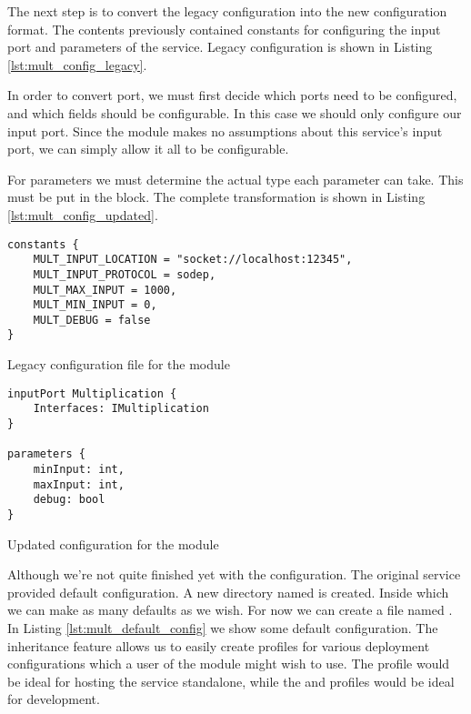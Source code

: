 The next step is to convert the legacy configuration into the new configuration
format. The contents  previously contained constants for
configuring the input port and parameters of the service. Legacy configuration
is shown in Listing \ref{lst:mult_config_legacy}.

In order to convert port, we must first decide which ports need to be
configured, and which fields should be configurable. In this case we should
only configure our input port. Since the module makes no assumptions about this
service's input port, we can simply allow it all to be configurable.

For parameters we must determine the actual type each parameter can take. This
must be put in the  block. The complete transformation is
shown in Listing \ref{lst:mult_config_updated}.

\begin{listing}[H]

\begin{verbatim}
constants {
    MULT_INPUT_LOCATION = "socket://localhost:12345",
    MULT_INPUT_PROTOCOL = sodep,
    MULT_MAX_INPUT = 1000,
    MULT_MIN_INPUT = 0,
    MULT_DEBUG = false
}
\end{verbatim}

\caption{Legacy configuration file for the  module}

\label{lst:mult_config_legacy}

\end{listing}

\begin{listing}[H]
\begin{verbatim}
inputPort Multiplication {
    Interfaces: IMultiplication
}

parameters {
    minInput: int,
    maxInput: int,
    debug: bool
}
\end{verbatim}
\caption{Updated configuration for the  module}
\label{lst:mult_config_updated}
\end{listing}

Although we're not quite finished yet with the configuration. The original
service provided default configuration. A new directory named  is
created. Inside which we can make as many defaults as we wish. For now we can
create a file named . In Listing
\ref{lst:mult_default_config} we show some default configuration.  The
inheritance feature allows us to easily create profiles for various deployment
configurations which a user of the module might wish to use. The
 profile would be ideal for hosting the service
standalone, while the  and  profiles would
be ideal for development.

